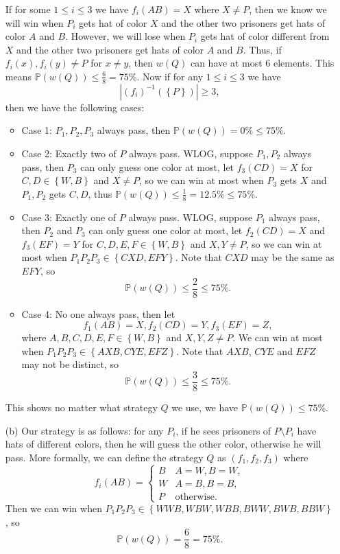 \documentclass[a4paper,12pt]{article}
\begin{document}
\begin{itemize}
	If for some \(1 \le i \le 3\) we have \(f_i(AB) = X\) where \(X \neq P\), then we know we will win when \(P_i\) gets hat of color \(X\) and the other two prisoners get hats of color \(A\) and \(B\). However, we will lose when \(P_i\) gets hat of color different from \(X\) and the other two prisoners get hats of color \(A\) and \(B\). Thus, if \(f_i(x), f_i(y) \neq P\) for \(x \neq y\), then \(w(Q)\) can have at most 6 elements. This means \(\mathbb{P} (w(Q)) \le \frac{6}{8} = 75 \%\). Now if for any \(1 \le i \le 3\) we have 
	\[
		\left\vert (f_i)^{-1}(\left\{ P \right\} ) \right\vert \ge 3, 
	\]        
	then we have the following cases:
	\begin{itemize}
		\item Case 1: \(P_1, P_2, P_3\) always pass, then \(\mathbb{P} (w(Q)) = 0 \% \le 75 \%\). 
		\item Case 2: Exactly two of \(P\) always pass. WLOG, suppose \(P_1, P_2\) always pass, then \(P_3\) can only guess one color at most, let \(f_3(CD) = X\) for \(C, D \in \left\{ W, B \right\} \) and \(X \neq P\), so we can win at most when \(P_3\) gets \(X\) and \(P_1, P_2\) gets \(C, D\), thus \(\mathbb{P} (w(Q)) \le \frac{1}{8} = 12.5 \% \le 75 \%\).
		\item Case 3: Exactly one of \(P\) always pass. WLOG, suppose \(P_1\) always pass, then \(P_2\) and \(P_3\) can only guess one color at most, let \(f_2(CD) = X\) and \(f_3(EF) = Y\) for \(C, D, E, F \in \left\{ W, B \right\}\) and \(X, Y \neq P\), so we can win at most when \(P_1 P_2 P_3 \in \left\{ CXD, EFY \right\} \). Note that \(CXD\) may be the same as \(EFY\), so
		\[
			\mathbb{P} (w(Q)) \le \frac{2}{8} \le 75\%.
		\]
		\item Case 4: No one always pass, then let
		\[
			f_1(AB) = X, f_2(CD) = Y, f_3(EF) = Z,
		\]
		where \(A, B, C, D, E, F \in \left\{ W, B \right\} \) and \(X, Y, Z \neq P\). We can win at most when \(P_1 P_2 P_3 \in \left\{ AXB, CYE, EFZ \right\} \). Note that \(AXB\), \(CYE\) and \(EFZ\) may not be distinct, so
		\[
			\mathbb{P} (w(Q)) \le \frac{3}{8} \le 75\%.
		\]
	\end{itemize}
	This shows no matter what strategy \(Q\) we use, we have \(\mathbb{P} (w(Q)) \le 75 \%\).
	\item [(b)] Our strategy is as follows: for any \(P_i\), if he sees prisoners of \(P \setminus P_i\) have hats of different colors, then he will guess the other color, otherwise he will pass. More formally, we can define the strategy \(Q\) as \((f_1, f_2, f_3)\) where
	\[
	f_i(AB) = \begin{cases}
		B & A = W, B = W, \\
		W & A = B, B = B, \\
		P & \text{otherwise}.
	\end{cases}
	\]
	Then we can win when \(P_1 P_2 P_3 \in \left\{WWB, WBW, WBB, BWW, BWB, BBW \right\} \), so
	\[
		\mathbb{P} (w(Q)) = \frac{6}{8} = 75 \%.
	\]
\end{itemize}
\end{document}
